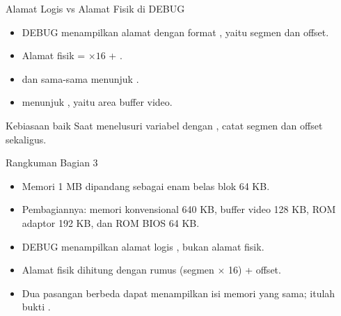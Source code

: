 \documentclass[aspectratio=169,11pt]{beamer}
\begin{document}
\begin{frame}{Alamat Logis vs Alamat Fisik di DEBUG}
\small
\begin{itemize}
    \item DEBUG menampilkan alamat dengan format
          , yaitu segmen dan offset.

    \vspace{0.18em}
    \item Alamat fisik =  $\times 16$ + .

    \vspace{0.18em}
    \item {} dan  sama-sama menunjuk
          .

    \vspace{0.18em}
    \item {} menunjuk , yaitu area buffer
          video.
\end{itemize}

\vspace{0.25em}
\begin{block}{Kebiasaan baik}
\small Saat menelusuri variabel dengan , catat
segmen dan offset sekaligus.
\end{block}
\end{frame}

\begin{frame}{Rangkuman Bagian 3}
\small
\begin{itemize}
    \item Memori 1 MB dipandang sebagai enam belas blok 64 KB.

    \vspace{0.15em}
    \item Pembagiannya: memori konvensional 640 KB, buffer video
          128 KB, ROM adaptor 192 KB, dan ROM BIOS 64 KB.

    \vspace{0.15em}
    \item DEBUG menampilkan alamat logis ,
          bukan alamat fisik.

    \vspace{0.15em}
    \item Alamat fisik dihitung dengan rumus
          (segmen $\times$ 16) + offset.

    \vspace{0.15em}
    \item Dua pasangan berbeda dapat menampilkan isi memori yang
          sama; itulah bukti .
\end{itemize}
\end{frame}
\end{document}
